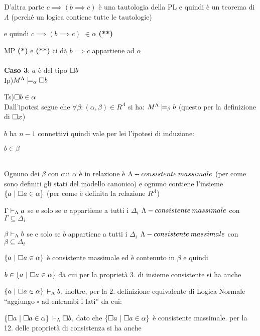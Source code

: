 D'altra parte $c\implies(b\implies c)$ è una tautologia della PL
e quindi è un teorema di $\Lambda$ (perché un logica contiene tutte
le tautologie)

e quindi $c\implies(b\implies c)$ $\in\alpha$ \textbf{({*}{*})}

MP \textbf{({*}) }e \textbf{({*}{*}) }ci dà $b\implies c$ appartiene
ad $\alpha$\\
 \\
 \textbf{Caso 3}: $a$ è del tipo $\square b$\\


Ip)$M^{\Lambda}\models_{\alpha}\square b$

Ts)$\square b\in\alpha$\\


Dall'ipotesi segue che $\forall\beta:(\alpha,\beta)\in R^{\Lambda}$
si ha: $M^{\Lambda}\models_{\beta}b$ (questo per la definizione
di $\square x$)

$b$ ha $n-1$ connettivi quindi vale per lei l'ipotesi di induzione:

$b\in\beta$

 \\


Ognuno dei $\beta$ con cui $\alpha$ è in relazione è $\Lambda-consistente\: massimale$
(per come sono definiti gli stati del modello canonico) e ognuno contiene
l'insieme $\{a\ |\ \square a\in\alpha\}$ (per come è definita la relazione
$R^{\Lambda}$)

$\Gamma\vdash_{\Lambda}a$ se e solo se $a$ appartiene a tutti i $\Delta_{i}$
$\Lambda-consistente\: massimale$ con $\Gamma\subseteq\Delta_{i}$

$\beta\vdash_{\Lambda}b$ se e solo se $b$ appartiene a tutti i $\Delta_{i}$
$\Lambda-consistente\: massimale$ con $\beta\subseteq\Delta_{i}$

$\{a\ |\ \square a\in\alpha\}$ è consistente massimale ed è contenuto
in $\beta$ e quindi

$b\in\{a\ |\ \square a\in\alpha\}$ da cui per la proprietà 3. di insieme
consistente si ha anche

$\{a\ |\ \square a\in\alpha\}$ $\vdash_{\Lambda}b$, inoltre, per la 2. definizione
equivalente di Logica Normale ``aggiungo $\square$ ad entrambi i
lati'' da cui:

$\{\square a\ |\ \square a\in\alpha\}$ $\vdash_{\Lambda}\square b$, dato che $\{\square a\ |\ \square a\in\alpha\}$
è consistente massimale. per la 12. delle proprietà di consistenza
si ha anche

